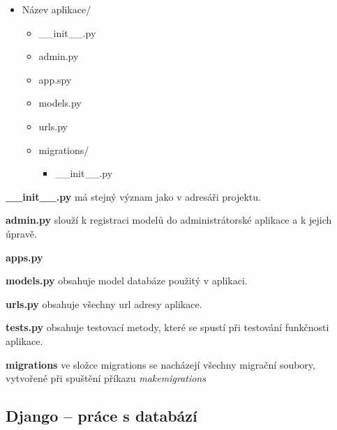\begin{itemize}
	\item \lbrack Název aplikace\rbrack /
 	\begin{itemize}
 		\item \_\_init\_\_.py
		\item admin.py
		\item app.spy
		\item models.py
		\item urls.py
		\item \lbrack migrations\rbrack /
		\begin{itemize}
			\item \_\_init\_\_.py
		\end{itemize}
	\end{itemize}
\end{itemize}

\vspace{9px}

\textbf{\_\_init\_\_.py} má stejný význam jako v adresáři projektu. 
\vspace{6px}

\textbf{admin.py} slouží k registraci modelů do administrátorské
aplikace a k jejich úpravě.  \vspace{6px}

\textbf{apps.py} 
\vspace{6px}

\textbf{models.py} obsahuje model databáze použitý v aplikaci.
\vspace{6px}

\textbf{urls.py} obsahuje všechny url adresy aplikace.
\vspace{6px}

\textbf{tests.py} obsahuje testovací metody, které se spustí při
testování funkčnosti aplikace.  \vspace{6px}

\textbf{migrations} ve složce migrations se nacházejí všechny migrační
soubory, vytvořené při spuštění příkazu \textit{makemigrations}

\newpage

\subsection{Django – práce s databází}

